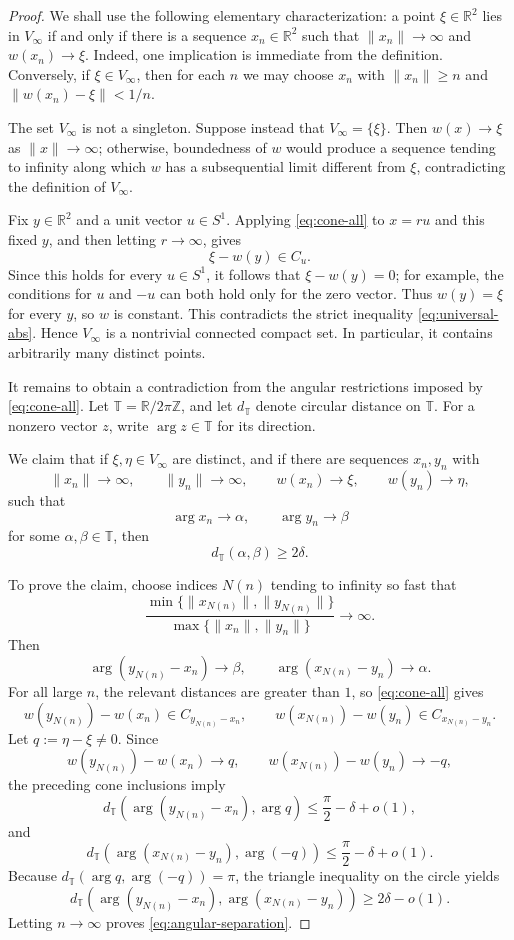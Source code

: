 \documentclass[11pt]{article}
\theoremstyle{remark}
\begin{document}
\begin{proof}
We shall use the following elementary characterization: a point $\xi\in\mathbb R^2$ lies in $V_\infty$ if and only if there is a sequence $x_n\in\mathbb R^2$ such that $\|x_n\|\to\infty$ and $w(x_n)\to\xi$. Indeed, one implication is immediate from the definition. Conversely, if $\xi\in V_\infty$, then for each $n$ we may choose $x_n$ with $\|x_n\|\ge n$ and $\|w(x_n)-\xi\|<1/n$.

The set $V_\infty$ is not a singleton. Suppose instead that $V_\infty=\{\xi\}$. Then $w(x)\to\xi$ as $\|x\|\to\infty$; otherwise, boundedness of $w$ would produce a sequence tending to infinity along which $w$ has a subsequential limit different from $\xi$, contradicting the definition of $V_\infty$.

Fix $y\in\mathbb R^2$ and a unit vector $u\in S^1$. Applying \eqref{eq:cone-all} to $x=ru$ and this fixed $y$, and then letting $r\to\infty$, gives
\[
\xi-w(y)\in C_u.
\]
Since this holds for every $u\in S^1$, it follows that $\xi-w(y)=0$; for example, the conditions for $u$ and $-u$ can both hold only for the zero vector. Thus $w(y)=\xi$ for every $y$, so $w$ is constant. This contradicts the strict inequality \eqref{eq:universal-abs}. Hence $V_\infty$ is a nontrivial connected compact set. In particular, it contains arbitrarily many distinct points.

It remains to obtain a contradiction from the angular restrictions imposed by \eqref{eq:cone-all}. Let $\mathbb T=\mathbb R/2\pi\mathbb Z$, and let $d_{\mathbb T}$ denote circular distance on $\mathbb T$. For a nonzero vector $z$, write $\arg z\in\mathbb T$ for its direction.

We claim that if $\xi,\eta\in V_\infty$ are distinct, and if there are sequences $x_n,y_n$ with
\[
\|x_n\|\to\infty,
\qquad
\|y_n\|\to\infty,
\qquad
w(x_n)\to\xi,
\qquad
w(y_n)\to\eta,
\]
such that
\[
\arg x_n\to\alpha,
\qquad
\arg y_n\to\beta
\]
for some $\alpha,\beta\in\mathbb T$, then
\begin{equation}\label{eq:angular-separation}
d_{\mathbb T}(\alpha,\beta)\ge 2\delta .
\end{equation}

To prove the claim, choose indices $N(n)$ tending to infinity so fast that
\[
\frac{\min\{\|x_{N(n)}\|,\|y_{N(n)}\|\}}
{\max\{\|x_n\|,\|y_n\|\}}
\longrightarrow \infty .
\]
Then
\[
\arg (y_{N(n)}-x_n)\to\beta,
\qquad
\arg (x_{N(n)}-y_n)\to\alpha .
\]
For all large $n$, the relevant distances are greater than $1$, so \eqref{eq:cone-all} gives
\[
w(y_{N(n)})-w(x_n)\in C_{y_{N(n)}-x_n},
\qquad
w(x_{N(n)})-w(y_n)\in C_{x_{N(n)}-y_n}.
\]
Let $q:=\eta-\xi\ne 0$. Since
\[
w(y_{N(n)})-w(x_n)\to q,
\qquad
w(x_{N(n)})-w(y_n)\to -q,
\]
the preceding cone inclusions imply
\[
d_{\mathbb T}(\arg (y_{N(n)}-x_n),\arg q)
\le \frac{\pi}{2}-\delta+o(1),
\]
and
\[
d_{\mathbb T}(\arg (x_{N(n)}-y_n),\arg(-q))
\le \frac{\pi}{2}-\delta+o(1).
\]
Because $d_{\mathbb T}(\arg q,\arg(-q))=\pi$, the triangle inequality on the circle yields
\[
d_{\mathbb T}(\arg (y_{N(n)}-x_n),\arg (x_{N(n)}-y_n))
\ge 2\delta-o(1).
\]
Letting $n\to\infty$ proves \eqref{eq:angular-separation}.


\end{proof}
\end{document}
